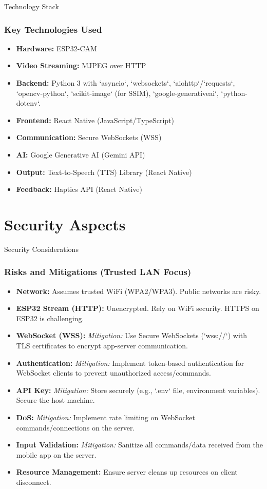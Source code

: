 \documentclass{beamer}
\begin{document}
\begin{frame}{Technology Stack}
    \frametitle{Key Technologies Used}
    \begin{itemize}
        \item \textbf{Hardware:} ESP32-CAM
        \item \textbf{Video Streaming:} MJPEG over HTTP
        \item \textbf{Backend:} Python 3 with `asyncio`, `websockets`, `aiohttp`/`requests`, `opencv-python`, `scikit-image` (for SSIM), `google-generativeai`, `python-dotenv`.
        \item \textbf{Frontend:} React Native (JavaScript/TypeScript)
        \item \textbf{Communication:} Secure WebSockets (WSS)
        \item \textbf{AI:} Google Generative AI (Gemini API)
        \item \textbf{Output:} Text-to-Speech (TTS) Library (React Native)
        \item \textbf{Feedback:} Haptics API (React Native)
    \end{itemize}
\end{frame}

\section{Security Aspects}

\begin{frame}{Security Considerations}
    \frametitle{Risks and Mitigations (Trusted LAN Focus)}
     \begin{itemize}
        \item \textbf{Network:} Assumes trusted WiFi (WPA2/WPA3). Public networks are risky.
        \item \textbf{ESP32 Stream (HTTP):} Unencrypted. Rely on WiFi security. HTTPS on ESP32 is challenging.
        \item \textbf{WebSocket (WSS):} \textit{Mitigation:} Use Secure WebSockets (`wss://`) with TLS certificates to encrypt app-server communication.
        \item \textbf{Authentication:} \textit{Mitigation:} Implement token-based authentication for WebSocket clients to prevent unauthorized access/commands.
        \item \textbf{API Key:} \textit{Mitigation:} Store securely (e.g., `.env` file, environment variables). Secure the host machine.
        \item \textbf{DoS:} \textit{Mitigation:} Implement rate limiting on WebSocket commands/connections on the server.
        \item \textbf{Input Validation:} \textit{Mitigation:} Sanitize all commands/data received from the mobile app on the server.
        \item \textbf{Resource Management:} Ensure server cleans up resources on client disconnect.
     \end{itemize}
\end{frame}
\end{document}
